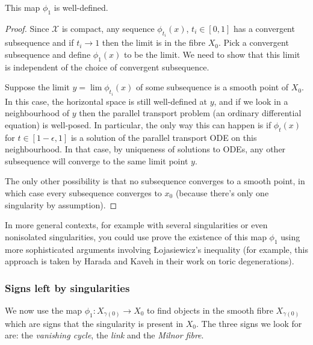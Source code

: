 \documentclass{article}
\begin{document}
\begin{Lemma}
This map \(\phi_1\) is well-defined.
\end{Lemma}
\begin{proof}
Since \(\mathcal{X}\) is compact, any sequence \(\phi_{t_i}(x)\),
\(t_i\in[0,1]\) has a convergent subsequence and if \(t_i\to 1\)
then the limit is in the fibre \(X_0\). Pick a convergent
subsequence and define \(\phi_1(x)\) to be the limit. We need to
show that this limit is independent of the choice of convergent
subsequence.


Suppose the limit \(y=\lim\phi_{t_i}(x)\) of some subsequence is a
smooth point of \(X_0\). In this case, the horizontal space is still
well-defined at \(y\), and if we look in a neighbourhood of \(y\)
then the parallel transport problem (an ordinary differential
equation) is well-posed. In particular, the only way this can happen
is if \(\phi_t(x)\) for \(t\in[1-\epsilon,1]\) is a solution of the
parallel transport ODE on this neighbourhood. In that case, by
uniqueness of solutions to ODEs, any other subsequence will converge
to the same limit point \(y\).


The only other possibility is that no subsequence converges to a
smooth point, in which case every subsequence converges to \(x_0\)
(because there's only one singularity by assumption). \qedhere


\end{proof}
In more general contexts, for example with several singularities or
even nonisolated singularities, you could use prove the existence of
this map \(\phi_1\) using more sophisticated arguments involving
\L{}ojasiewicz's inequality (for example, this approach is taken by
Harada and Kaveh in their work on toric degenerations).


\subsubsection{Signs left by singularities}


We now use the map \(\phi_1\colon X_{\gamma(0)}\to X_0\) to find
objects in the smooth fibre \(X_{\gamma(0)}\) which are signs that the
singularity is present in \(X_0\). The three signs we look for are:
the {\em vanishing cycle}, the {\em link} and the {\em Milnor fibre}.
\end{document}
